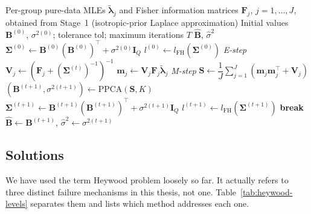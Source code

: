 \begin{algorithm}[htbp]
\caption{FH-EM: maximum-likelihood estimation of $\bm{\Sigma}$}
\label{alg:fhem}
\begin{algorithmic}[1]
\Require Per-group pure-data MLEs $\tilde{\bm{\lambda}}_j$ and Fisher information matrices $\mathbf{F}_j$, $j=1,\dots,J$, obtained from Stage~1 (isotropic-prior Laplace approximation)
\Require Initial values $\mathbf{B}^{(0)}$, $\sigma^{2(0)}$; tolerance $\mathrm{tol}$; maximum iterations $T$
\Ensure $\hat{\mathbf{B}}$, $\hat\sigma^2$
\State $\bm{\Sigma}^{(0)} \gets \mathbf{B}^{(0)}(\mathbf{B}^{(0)})^{\top} + \sigma^{2(0)}\mathbf{I}_Q$
\State $l^{(0)} \gets l_{\text{FH}}(\bm{\Sigma}^{(0)})$
    \Statex \hspace{\algorithmicindent}\textit{E-step}
        \State $\mathbf{V}_j \gets \left(\mathbf{F}_j + (\bm{\Sigma}^{(t)})^{-1}\right)^{-1}$
        \State $\mathbf{m}_j \gets \mathbf{V}_j \mathbf{F}_j \tilde{\bm{\lambda}}_j$
    \EndFor
    \Statex \hspace{\algorithmicindent}\textit{M-step}
    \State $\mathbf{S} \gets \dfrac{1}{J}\displaystyle\sum_{j=1}^{J}\left(\mathbf{m}_j\mathbf{m}_j^{\top} + \mathbf{V}_j\right)$
    \State $\left(\mathbf{B}^{(t+1)}, \sigma^{2(t+1)}\right) \gets \mathrm{PPCA}(\mathbf{S}, K)$ 
    \State $\bm{\Sigma}^{(t+1)} \gets \mathbf{B}^{(t+1)}(\mathbf{B}^{(t+1)})^{\top} + \sigma^{2(t+1)}\mathbf{I}_Q$
    \State $l^{(t+1)} \gets l_{\text{FH}}(\bm{\Sigma}^{(t+1)})$
    \State \textbf{break}
    \EndIf
\EndFor
\State \Return $\hat{\mathbf{B}} \gets \mathbf{B}^{(t+1)}$, $\hat\sigma^2 \gets \sigma^{2(t+1)}$
\end{algorithmic}
\end{algorithm}

\iffalse
\subsection{Solutions}
\label{subsec:solutions}

We have used the term Heywood problem loosely so far. It actually refers to three distinct failure mechanisms in this thesis, not one. Table~\ref{tab:heywood-levels} separates them and lists which method addresses each one.

